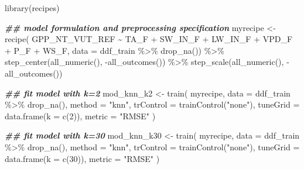 \documentclass[
]{book}
\newenvironment{Shaded}{\begin{snugshade}}{\end{snugshade}}
\newcommand{\AttributeTok}[1]{\textcolor[rgb]{0.77,0.63,0.00}{#1}}
\newcommand{\DecValTok}[1]{\textcolor[rgb]{0.00,0.00,0.81}{#1}}
\newcommand{\DocumentationTok}[1]{\textcolor[rgb]{0.56,0.35,0.01}{\textbf{\textit{#1}}}}
\newcommand{\FunctionTok}[1]{\textcolor[rgb]{0.00,0.00,0.00}{#1}}
\newcommand{\NormalTok}[1]{#1}
\newcommand{\OtherTok}[1]{\textcolor[rgb]{0.56,0.35,0.01}{#1}}
\newcommand{\SpecialCharTok}[1]{\textcolor[rgb]{0.00,0.00,0.00}{#1}}
\newcommand{\StringTok}[1]{\textcolor[rgb]{0.31,0.60,0.02}{#1}}
\begin{document}
\begin{Shaded}
\begin{Highlighting}[]
\FunctionTok{library}\NormalTok{(recipes)}

\DocumentationTok{\#\# model formulation and preprocessing specification}
\NormalTok{myrecipe }\OtherTok{\textless{}{-}} \FunctionTok{recipe}\NormalTok{(}
\NormalTok{  GPP\_NT\_VUT\_REF }\SpecialCharTok{\textasciitilde{}}\NormalTok{ TA\_F }\SpecialCharTok{+}\NormalTok{ SW\_IN\_F }\SpecialCharTok{+}\NormalTok{ LW\_IN\_F }\SpecialCharTok{+}\NormalTok{ VPD\_F }\SpecialCharTok{+}\NormalTok{ P\_F }\SpecialCharTok{+}\NormalTok{ WS\_F, }
  \AttributeTok{data =}\NormalTok{ ddf\_train }\SpecialCharTok{\%\textgreater{}\%} \FunctionTok{drop\_na}\NormalTok{()) }\SpecialCharTok{\%\textgreater{}\%} 
  \FunctionTok{step\_center}\NormalTok{(}\FunctionTok{all\_numeric}\NormalTok{(), }\SpecialCharTok{{-}}\FunctionTok{all\_outcomes}\NormalTok{()) }\SpecialCharTok{\%\textgreater{}\%}
  \FunctionTok{step\_scale}\NormalTok{(}\FunctionTok{all\_numeric}\NormalTok{(), }\SpecialCharTok{{-}}\FunctionTok{all\_outcomes}\NormalTok{())}

\DocumentationTok{\#\# fit model with k=2}
\NormalTok{mod\_knn\_k2 }\OtherTok{\textless{}{-}} \FunctionTok{train}\NormalTok{(}
\NormalTok{  myrecipe, }
  \AttributeTok{data =}\NormalTok{ ddf\_train }\SpecialCharTok{\%\textgreater{}\%} 
    \FunctionTok{drop\_na}\NormalTok{(), }
  \AttributeTok{method =} \StringTok{"knn"}\NormalTok{,}
  \AttributeTok{trControl =} \FunctionTok{trainControl}\NormalTok{(}\StringTok{"none"}\NormalTok{),}
  \AttributeTok{tuneGrid =} \FunctionTok{data.frame}\NormalTok{(}\AttributeTok{k =} \FunctionTok{c}\NormalTok{(}\DecValTok{2}\NormalTok{)),}
  \AttributeTok{metric =} \StringTok{"RMSE"}
\NormalTok{  )}

\DocumentationTok{\#\# fit model with k=30}
\NormalTok{mod\_knn\_k30 }\OtherTok{\textless{}{-}} \FunctionTok{train}\NormalTok{(}
\NormalTok{  myrecipe, }
  \AttributeTok{data =}\NormalTok{ ddf\_train }\SpecialCharTok{\%\textgreater{}\%} 
    \FunctionTok{drop\_na}\NormalTok{(), }
  \AttributeTok{method =} \StringTok{"knn"}\NormalTok{,}
  \AttributeTok{trControl =} \FunctionTok{trainControl}\NormalTok{(}\StringTok{"none"}\NormalTok{),}
  \AttributeTok{tuneGrid =} \FunctionTok{data.frame}\NormalTok{(}\AttributeTok{k =} \FunctionTok{c}\NormalTok{(}\DecValTok{30}\NormalTok{)),}
  \AttributeTok{metric =} \StringTok{"RMSE"}
\NormalTok{  )}
\end{Highlighting}
\end{Shaded}
\end{document}
